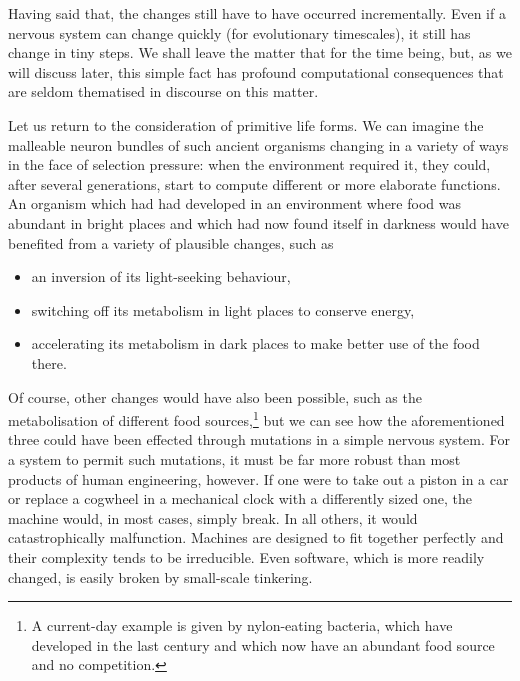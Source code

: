 Having said that, the changes still have to have occurred incrementally. Even if a nervous system can change quickly (for evolutionary timescales), it still has change in tiny steps. We shall leave the matter that for the time being, but, as we will discuss later, this simple fact has profound computational consequences that are seldom thematised in discourse on this matter. 

Let us return to the consideration of primitive life forms. We can imagine the malleable neuron bundles of such ancient organisms changing in a variety of ways in the face of selection pressure: when the environment required it, they could, after several generations, start to compute different or more elaborate functions. An organism which had had developed in an environment where food was abundant in bright places and which had now found itself in darkness would have benefited from a variety of plausible changes, such as
\begin{itemize}
	\item an inversion of its light-seeking behaviour,
	\item switching off its metabolism in light places to conserve energy,
	\item accelerating its metabolism in dark places to make better use of the food there.
\end{itemize}

Of course, other changes would have also been possible, such as the metabolisation of different food sources,\footnote{A current-day example is given by nylon-eating bacteria, which have developed in the last century and which now have an abundant food source and no competition.} but we can see how the aforementioned three could have been effected through mutations in a simple nervous system. For a system to permit such mutations, it must be far more robust than most products of human engineering, however. If one were to take out a piston in a car or replace a cogwheel in a mechanical clock with a differently sized one, the machine would, in most cases, simply break. In all others, it would catastrophically malfunction. Machines are designed to fit together perfectly and their complexity tends to be irreducible. Even software, which is more readily changed, is easily broken by small-scale tinkering.


